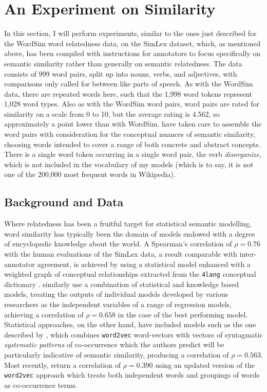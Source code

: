 \section{An Experiment on Similarity} \label{sec:simperiment}
In this section, I will perform experiments, similar to the ones just described for the WordSim word relatedness data, on the SimLex dataset, which, as mentioned above, has been compiled with instructions for annotators to focus specifically on semantic similarity rather than generally on semantic relatedness.  The data consists of 999 word pairs, split up into nouns, verbs, and adjectives, with comparisons only called for between like parts of speech.  As with the WordSim data, there are repeated words here, such that the 1,998 word tokens represent 1,028 word types.  Also as with the WordSim word pairs, word pairs are rated for similarity on a scale from 0 to 10, but the average rating is 4.562, so approximately a point lower than with WordSim.  \cite{HillEA2015} have taken care to assemble the word pairs with consideration for the conceptual nuances of semantic similarity, choosing words intended to cover a range of both concrete and abstract concepts.  There is a single word token occurring in a single word pair, the verb \emph{disorganize}, which is not included in the vocabulary of my models (which is to say, it is not one of the 200,000 most frequent words in Wikipedia).

\subsection{Background and Data}
Where relatedness has been a fruitful target for statistical semantic modelling, word similarity has typically been the domain of models endowed with a degree of encyclopedic knowledge about the world.  A Spearman's correlation of $\rho = 0.76$ with the human evaluations of the SimLex data, a result comparable with inter-annotator agreement, is achieved by \cite{RecskiEA2016} using a statistical model enhanced with a weighted graph of conceptual relationships extracted from the \texttt{4lang} conceptual dictionary \citep{KornaiEA2015}.  \cite{BanjadeEA2015} similarly use a combination of statistical and knowledge based models, treating the outputs of individual models developed by various researchers as the independent variables of a range of regression models, achieving a correlation of $\rho = 0.658$ in the case of the best performing model.  Statistical approaches, on the other hand, have included models such as the one described by \cite{SchwartzEA2015}, which combines \texttt{word2vec} word-vectors with vectors of syntagmatic \emph{systematic patterns} of co-occurrence which the authors predict will be particularly indicative of semantic similarity, producing a correlation of $\rho = 0.563$.  Most recently, \cite{MaEA2017} return a correlation of $\rho = 0.390$ using an updated version of the \texttt{word2vec} approach which treats both independent words and groupings of words as co-occurrence terms.


